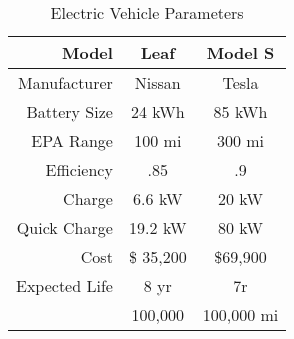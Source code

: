 \begin{table}
\centering
\begin{tabular}{| r |  c c |}
\hline
\rowcolor[gray]{.8} \bf Model		&	\bf Leaf  		&   \bf  Model S 	 \\
\hline
 Manufacturer 	&	Nissan		&	Tesla  	\\
\rowcolor[gray]{.95}Battery Size	&	24 kWh	&	85 kWh	\\
EPA Range	&	100 mi 		&	300 mi 		\\
\rowcolor[gray]{.95}Efficiency	&	.85		&	.9		\\
Charge		&	6.6 kW		&	20 kW		\\
\rowcolor[gray]{.95}Quick Charge	&	19.2 kW	&	80 kW		\\
Cost		&	\$ 35,200	&	\$69,900	\\
\rowcolor[gray]{.95}Expected Life	&	8 yr 		&	7r		\\
		&	100,000   	&	100,000 mi  	\\
\hline

\end{tabular}

\caption{ Electric Vehicle Parameters }
\label{tab:evp}
\end{table}